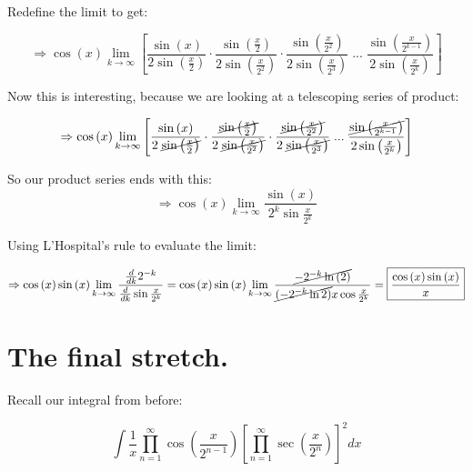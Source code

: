 \documentclass{article}
\begin{document}
Redefine the limit to get:

\begin{equation}
    \Rightarrow\cos{\left(x\right)}\lim_{k\rightarrow \infty} \left [ \frac{\sin{\left(x\right)}}{2\sin\left(\frac{x}{2}\right)} \cdot  \frac{\sin{\left(\frac{x}{2}\right)}}{2\sin\left(\frac{x}{2^2}\right)} \cdot \frac{\sin{\left(\frac{x}{2^2}\right)}}{2\sin\left(\frac{x}{2^3}\right)} \; ... \; \frac{\sin{\left(\frac{x}{2^{k-1}}\right)}}{2\sin\left(\frac{x}{2^k}\right)} \right]
\end{equation}

Now this is interesting, because we are looking at a telescoping series of product:

\begin{equation}
    \Rightarrow\cos{\left(x\right)}\lim_{k\rightarrow \infty} \left [ \frac{\sin{\left(x\right)}}{2\; \cancel{\sin\left(\frac{x}{2}\right)}} \cdot  \frac{\cancel{\sin{\left(\frac{x}{2}\right)}}}{2\;\cancel{\sin\left(\frac{x}{2^2}\right)}} \cdot \frac{\cancel{\sin{\left(\frac{x}{2^2}\right)}}}{2\; \cancel{\sin\left(\frac{x}{2^3}\right)}} \; ... \; \frac{\cancel{\sin{\left(\frac{x}{2^{k-1}}\right)}}}{2\sin\left(\frac{x}{2^k}\right)} \right]
\end{equation}

So our product series ends with this:
\begin{equation}
    \Rightarrow\cos{\left(x\right)}\lim_{k\rightarrow \infty} \frac{\sin{(x)}}{2^k\sin{\frac{x}{2^k}}}
\end{equation}

Using L'Hospital's rule to evaluate the limit:

\label{s}
\begin{equation}
    \Rightarrow\cos{(x)}\sin{(x)}\lim_{k\rightarrow \infty} \frac{\frac{d}{dk}2^{-k}}{\frac{d}{dk}\sin{\frac{x}{2^k}}}=\cos{(x)}\sin{(x)}\lim_{k\rightarrow \infty} \frac{\cancel{-2^{-k}\ln{(2)}}}{\cancel{(-2^{-k}\ln{2})}x \cos{\frac{x}{2^k}}}=\boxed{\frac{\cos{(x)}\sin{(x)}}{x}}
\end{equation}

\newpage

\section{The final stretch.}

Recall our integral from before:

\begin{equation}
    \int{ \frac{1}{x} \prod_{n=1}^{\infty}  \cos{\left( \frac{x}{2^{n-1}}\right)} \left[ \prod_{n=1}^{\infty}\sec{\left( \frac{x}{2^n} \right)}  \right]^2  dx}
\end{equation}
\end{document}
